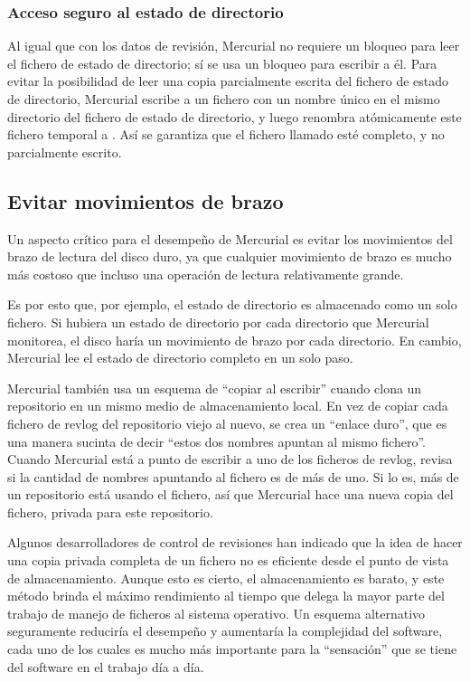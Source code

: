 \subsubsection{Acceso seguro al estado de directorio}

Al igual que con los datos de revisión, Mercurial no requiere un
bloqueo para leer el fichero de estado de directorio; sí se usa un
bloqueo para escribir a él. Para evitar la posibilidad de leer una
copia parcialmente escrita del fichero de estado de directorio,
Mercurial escribe a un fichero con un nombre único en el mismo
directorio del fichero de estado de directorio, y luego renombra
atómicamente este fichero temporal a . Así se garantiza que el fichero llamado
 esté completo, y no parcialmente escrito.

\subsection{Evitar movimientos de brazo}

Un aspecto crítico para el desempeño de Mercurial es evitar los
movimientos del brazo de lectura del disco duro, ya que cualquier
movimiento de brazo es mucho más costoso que incluso una operación de
lectura relativamente grande.

Es por esto que, por ejemplo, el estado de directorio es almacenado
como un solo fichero. Si hubiera un estado de directorio por cada
directorio que Mercurial monitorea, el disco haría un movimiento de
brazo por cada directorio. En cambio, Mercurial lee el estado de
directorio completo en un solo paso.

Mercurial también usa un esquema de ``copiar al escribir'' cuando
clona un repositorio en un mismo medio de almacenamiento local. En vez
de copiar cada fichero de revlog del repositorio viejo al nuevo, se
crea un ``enlace duro'', que es una manera sucinta de decir
``estos dos nombres apuntan al mismo fichero''. Cuando Mercurial está
a punto de escribir a uno de los ficheros de revlog, revisa si la
cantidad de nombres apuntando al fichero es de más de uno. Si lo es,
más de un repositorio está usando el fichero, así que Mercurial hace
una nueva copia del fichero, privada para este repositorio.

Algunos desarrolladores de control de revisiones han indicado que la
idea de hacer una copia privada completa de un fichero no es eficiente
desde el punto de vista de almacenamiento. Aunque esto es cierto, el
almacenamiento es barato, y este método brinda el máximo rendimiento
al tiempo que delega la mayor parte del trabajo de manejo de ficheros
al sistema operativo. Un esquema alternativo seguramente reduciría el
desempeño y aumentaría la complejidad del software, cada uno de los
cuales es mucho más importante para la ``sensación'' que se tiene del
software en el trabajo día a día.

